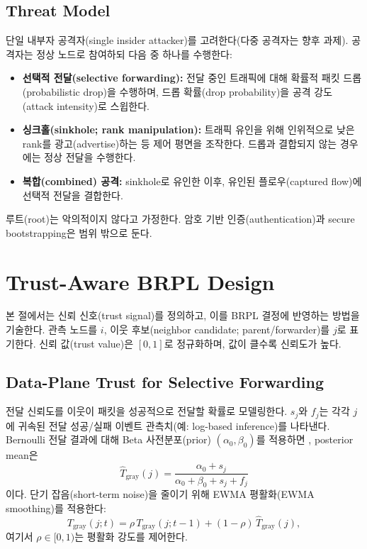 \documentclass[11pt,a4paper]{article}
\begin{document}
\subsection{Threat Model}
단일 내부자 공격자(single insider attacker)를 고려한다(다중 공격자는 향후 과제). 공격자는 정상 노드로 참여하되 다음 중 하나를 수행한다:
\begin{itemize}[leftmargin=*]
  \item \textbf{선택적 전달(selective forwarding):} 전달 중인 트래픽에 대해 확률적 패킷 드롭(probabilistic drop)을 수행하며, 드롭 확률(drop probability)을 공격 강도(attack intensity)로 스윕한다.
  \item \textbf{싱크홀(sinkhole; rank manipulation):} 트래픽 유인을 위해 인위적으로 낮은 rank를 광고(advertise)하는 등 제어 평면을 조작한다. 드롭과 결합되지 않는 경우에는 정상 전달을 수행한다.
  \item \textbf{복합(combined) 공격:} sinkhole로 유인한 이후, 유인된 플로우(captured flow)에 선택적 전달을 결합한다.
\end{itemize}
루트(root)는 악의적이지 않다고 가정한다. 암호 기반 인증(authentication)과 secure bootstrapping은 범위 밖으로 둔다.

\section{Trust-Aware BRPL Design}
\label{sec:design}
본 절에서는 신뢰 신호(trust signal)를 정의하고, 이를 BRPL 결정에 반영하는 방법을 기술한다. 관측 노드를 $i$, 이웃 후보(neighbor candidate; parent/forwarder)를 $j$로 표기한다. 신뢰 값(trust value)은 $[0,1]$로 정규화하며, 값이 클수록 신뢰도가 높다.

\subsection{Data-Plane Trust for Selective Forwarding}
\label{subsec:grayhole}
전달 신뢰도를 이웃이 패킷을 성공적으로 전달할 확률로 모델링한다. $s_j$와 $f_j$는 각각 $j$에 귀속된 전달 성공/실패 이벤트 관측치(예: log-based inference)를 나타낸다. Bernoulli 전달 결과에 대해 Beta 사전분포(prior) $(\alpha_0,\beta_0)$를 적용하면 \citep{ganeriwal2004reputation,ganeriwal2008tosn}, posterior mean은
\begin{equation}
\hat{T}_{\text{gray}}(j)=\frac{\alpha_0+s_j}{\alpha_0+\beta_0+s_j+f_j}
\end{equation}
이다. 단기 잡음(short-term noise)을 줄이기 위해 EWMA 평활화(EWMA smoothing)를 적용한다:
\begin{equation}
T_{\text{gray}}(j;t)=\rho\,T_{\text{gray}}(j;t\!-\!1)+(1-\rho)\,\hat{T}_{\text{gray}}(j),
\end{equation}
여기서 $\rho\in[0,1)$는 평활화 강도를 제어한다.
\end{document}
